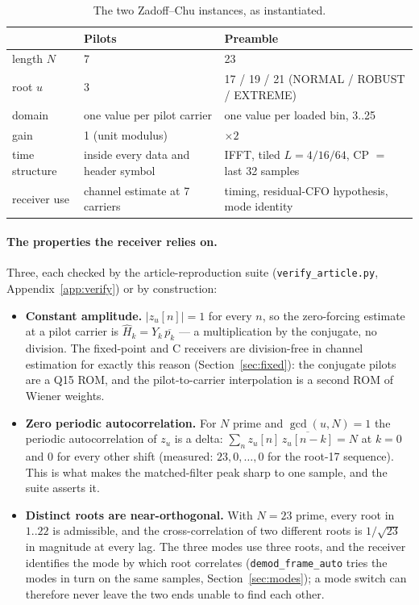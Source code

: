 \begin{table}[H]
    \centering
    \caption{The two Zadoff--Chu instances, as instantiated.}
    \label{tab:zc_instances}
    \small
    \begin{tabular}{@{}lll@{}}
    \toprule
    & \textbf{Pilots} & \textbf{Preamble} \\
    \midrule
    length $N$ & 7 & 23 \\
    root $u$ & 3 & 17 / 19 / 21 (NORMAL / ROBUST / EXTREME) \\
    domain & one value per pilot carrier & one value per loaded bin, 3..25 \\
    gain & 1 (unit modulus) & $\times 2$ \\
    time structure & inside every data and header symbol &
        IFFT, tiled $L = 4 / 16 / 64$, CP $=$ last 32 samples \\
    receiver use & channel estimate at 7 carriers &
        timing, residual-CFO hypothesis, mode identity \\
    \bottomrule
    \end{tabular}
\end{table}

\paragraph{The properties the receiver relies on.}  Three, each
checked by the article-reproduction suite
(\texttt{verify\_article.py}, Appendix~\ref{app:verify}) or by
construction:
\begin{itemize}
    \item \textbf{Constant amplitude.}  $|z_u[n]| = 1$ for every $n$,
          so the zero-forcing estimate at a pilot carrier is
          $\hat H_k = Y_k\,\overline{p_k}$ --- a multiplication by the
          conjugate, no division.  The fixed-point and C receivers are
          division-free in channel estimation for exactly this reason
          (Section~\ref{sec:fixed}): the conjugate pilots are a Q15
          ROM, and the pilot-to-carrier interpolation is a second ROM
          of Wiener weights.
    \item \textbf{Zero periodic autocorrelation.}  For $N$ prime and
          $\gcd(u, N) = 1$ the periodic autocorrelation of $z_u$ is a
          delta: $\sum_n z_u[n]\,\overline{z_u[n-k]} = N$ at $k = 0$ and
          $0$ for every other shift (measured: $23, 0, \ldots, 0$ for
          the root-17 sequence).  This is what makes the matched-filter
          peak sharp to one sample, and the suite asserts it.
    \item \textbf{Distinct roots are near-orthogonal.}  With $N = 23$
          prime, every root in $1..22$ is admissible, and the
          cross-correlation of two different roots is $1/\sqrt{23}$ in
          magnitude at every lag.  The three modes use three roots, and
          the receiver identifies the mode by which root correlates
          (\texttt{demod\_frame\_auto} tries the modes in turn on the
          same samples, Section~\ref{sec:modes}); a mode switch can
          therefore never leave the two ends unable to find each other.
\end{itemize}

